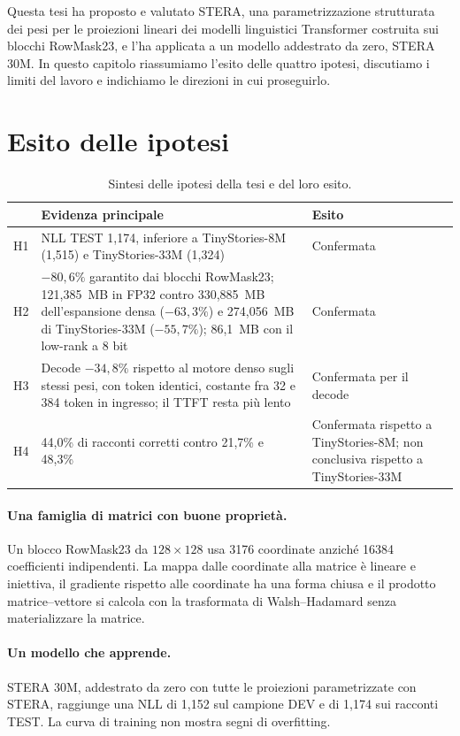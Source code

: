 Questa tesi ha proposto e valutato STERA, una parametrizzazione strutturata dei pesi per le proiezioni lineari dei modelli linguistici Transformer costruita sui blocchi RowMask23, e l'ha applicata a un modello addestrato da zero, STERA 30M. In questo capitolo riassumiamo l'esito delle quattro ipotesi, discutiamo i limiti del lavoro e indichiamo le direzioni in cui proseguirlo.

\section{Esito delle ipotesi}

\begin{table}[htbp]
\centering
\small
\begin{tabularx}{\linewidth}{lX>{\raggedright\arraybackslash}p{3.4cm}}
\toprule
& Evidenza principale & Esito \\
\midrule
H1 & NLL TEST 1,174, inferiore a TinyStories-8M (1,515) e TinyStories-33M (1,324) & Confermata \\
H2 & $-80{,}6\%$ garantito dai blocchi RowMask23; 121,385~MB in FP32 contro 330,885~MB dell'espansione densa ($-63{,}3\%$) e 274,056~MB di TinyStories-33M ($-55{,}7\%$); 86,1~MB con il low-rank a 8 bit & Confermata \\
H3 & Decode $-34{,}8\%$ rispetto al motore denso sugli stessi pesi, con token identici, costante fra 32 e 384 token in ingresso; il TTFT resta più lento & Confermata per il decode \\
H4 & 44,0\% di racconti corretti contro 21,7\% e 48,3\% & Confermata rispetto a TinyStories-8M; non conclusiva rispetto a TinyStories-33M \\
\bottomrule
\end{tabularx}
\caption{Sintesi delle ipotesi della tesi e del loro esito.}
\label{tab:esito-ipotesi}
\end{table}

\paragraph{Una famiglia di matrici con buone proprietà.} Un blocco RowMask23 da $128\times128$ usa \num{3176} coordinate anziché \num{16384} coefficienti indipendenti. La mappa dalle coordinate alla matrice è lineare e iniettiva, il gradiente rispetto alle coordinate ha una forma chiusa e il prodotto matrice--vettore si calcola con la trasformata di Walsh--Hadamard senza materializzare la matrice.

\paragraph{Un modello che apprende.} STERA 30M, addestrato da zero con tutte le proiezioni parametrizzate con STERA, raggiunge una NLL di 1,152 sul campione DEV e di 1,174 sui racconti TEST. La curva di training non mostra segni di overfitting.

